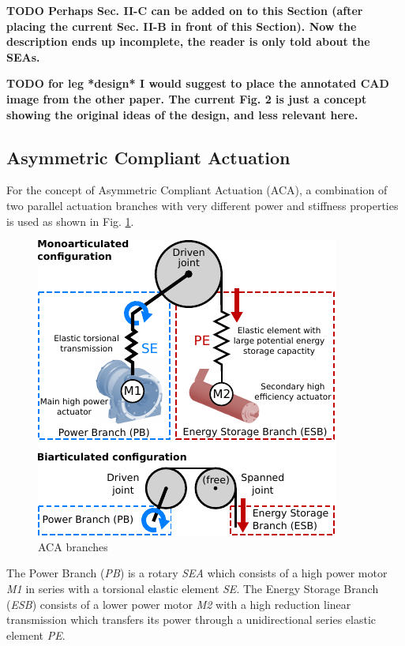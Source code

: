 \documentclass[letterpaper, 10 pt, conference]{ieeeconf}  %
\begin{document}
\textbf{TODO Perhaps Sec. II-C can be added on to this Section (after placing the current Sec. II-B in front of this Section). Now the description ends up incomplete, the reader is only told about the SEAs.}

\textbf{TODO for leg *design* I would suggest to place the annotated CAD image from the other paper. The current Fig. 2 is just a concept showing the original ideas of the design, and less relevant here.}

\subsection{Asymmetric Compliant Actuation}
For the concept of Asymmetric Compliant Actuation (ACA), a combination of two parallel actuation branches with very different power and stiffness properties is used as shown in Fig. \ref{fig:ACA}.



\begin{figure}[b]
	\centering
	\includegraphics[scale=1.0]{actuationConcept}
	\caption{ACA branches}
	\label{fig:ACA}
\end{figure}

The Power Branch (\textit{PB}) is a rotary \textit{SEA} which consists of a high power motor \textit{M1} in series with a torsional elastic element \textit{SE}. The Energy Storage Branch (\textit{ESB}) consists of a lower power motor \textit{M2} with a high reduction linear transmission which transfers its power through a unidirectional series elastic element \textit{PE}.
 
\end{document}
